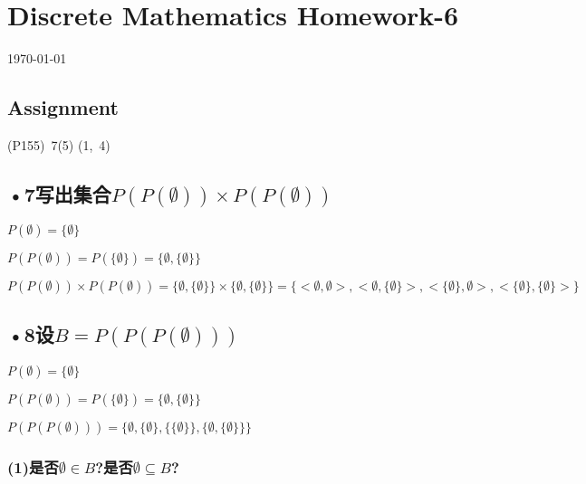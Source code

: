 \documentclass[UTF8]{ctexart}
\begin{document}
\section*{Discrete Mathematics Homework-6}
\begin{center}
\today
\end{center}
\subsection*{Assignment}

(P155)\ 7(5) (1,\ 4)

\subsection*{•7写出集合$P(P(\emptyset))\times P(P(\emptyset)) $}

$ P(\emptyset)=\{\emptyset \}$

$ P(P(\emptyset))=P(\{\emptyset \})=\{\emptyset , \{\emptyset \}\}$





$P(P(\emptyset))\times P(P(\emptyset))=\{\emptyset , \{\emptyset \}\}\times \{\emptyset , \{\emptyset \}\}=\{ <\emptyset,\emptyset> ,<\emptyset, \{\emptyset \}>,< \{\emptyset \},\emptyset>,< \{\emptyset \}, \{\emptyset \}>\}$
\subsection*{•8设$B=P(P(P(\emptyset)))$}

$ P(\emptyset)=\{\emptyset \}$

$ P(P(\emptyset))=P(\{\emptyset \})=\{\emptyset , \{\emptyset \}\}$

$ P(P(P(\emptyset)))=\{\emptyset ,\{\emptyset \},\{\{\emptyset \} \}, \{\emptyset , \{\emptyset \}\} \}$
\subsubsection*{(1)是否$\emptyset \in B$?是否$\emptyset \subseteq B$?}
\end{document}
